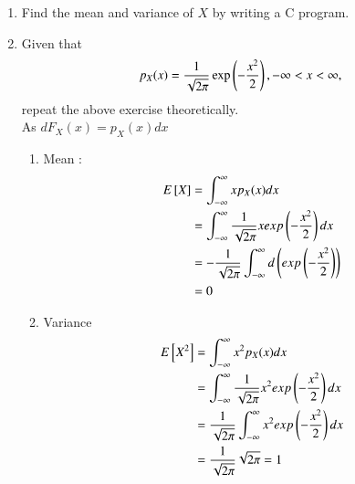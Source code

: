\documentclass[journal,12pt,twocolumn]{IEEEtran}
\renewcommand\thesection{\arabic{section}}
\begin{document}
\begin{enumerate}[label=\thesection.\arabic*
,ref=\thesection.\theenumi]
\item Find the mean and variance of $X$ by writing a C program.
\item Given that 
\begin{align}
p_{X}(x) = \frac{1}{\sqrt{2\pi}}\exp\left(-\frac{x^2}{2}\right), -\infty < x < \infty,
\end{align}
repeat the above exercise theoretically.\\
\solution As $dF_X(x)=p_X(x)dx$
\begin{enumerate}
\item Mean :
\begin{align}
E{}\left[X\right]&=\int_{-\infty}^{\infty}xp_X(x)dx \\
&=\int_{-\infty}^{\infty}\frac{1}{\sqrt{2\pi}}xexp\left(-\frac{x^2}{2}\right)dx \\
&=-\frac{1}{\sqrt{2\pi}}\int_{-\infty}^{\infty}d\left(exp\left(-\frac{x^2}{2}\right)\right) \\
&=0
\end{align}
\item Variance
\begin{align}
E {}\left[X^2\right]&=\int_{-\infty}^{\infty}x^2p_X(x)dx \\
&=\int_{-\infty}^{\infty}\frac{1}{\sqrt{2\pi}}x^2exp\left(-\frac{x^2}{2}\right)dx \\
&=\frac{1}{\sqrt{2\pi}}\int_{-\infty}^{\infty}x^2exp\left(-\frac{x^2}{2}\right)dx \\
&=\frac{1}{\sqrt{2\pi}}\sqrt{2\pi}=1
\end{align}
\end{enumerate}
\end{enumerate}
\end{document}
